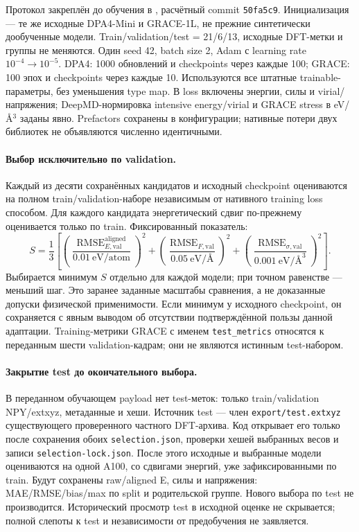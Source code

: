 \documentclass[11pt,a4paper]{article}
\begin{document}
Протокол закреплён до обучения в
,
расчётный commit \texttt{50fa5c9}. Инициализация --- те же исходные
DPA4-Mini и GRACE-1L, не прежние синтетически дообученные модели.
Train/validation/test = 21/6/13, исходные DFT-метки и группы не меняются.
Один seed 42, batch size 2, Adam с learning rate $10^{-4}\to10^{-5}$.
DPA4: 1000 обновлений и checkpoints через каждые 100;
GRACE: 100 эпох и checkpoints через каждые 10.
Используются все штатные trainable-параметры, без уменьшения type map.
В loss включены энергии, силы и virial/напряжения;
DeepMD-нормировка intensive energy/virial и GRACE stress в eV/\AA$^3$
заданы явно. Prefactors сохранены в конфигурации; нативные потери
двух библиотек не объявляются численно идентичными.

\paragraph{Выбор исключительно по validation.}
Каждый из десяти сохранённых кандидатов и исходный checkpoint
оцениваются на полном train/validation-наборе независимым от нативного
training loss способом. Для каждого кандидата энергетический сдвиг
по-прежнему оценивается только по train. Фиксированный показатель:
\[
 S=\frac{1}{3}\left[
 \left(\frac{\operatorname{RMSE}_{E,\mathrm{val}}^{\mathrm{aligned}}}
 {0.01\ \mathrm{eV/atom}}\right)^2+
 \left(\frac{\operatorname{RMSE}_{F,\mathrm{val}}}
 {0.05\ \text{eV/\AA}}\right)^2+
 \left(\frac{\operatorname{RMSE}_{\sigma,\mathrm{val}}}
 {0.001\ \mathrm{eV}/\text{\AA}^{3}}\right)^2\right].
\]
Выбирается минимум $S$ отдельно для каждой модели; при точном равенстве
--- меньший шаг. Это заранее заданные масштабы сравнения, а не
доказанные допуски физической применимости. Если минимум у исходного
checkpoint, он сохраняется с явным выводом об отсутствии подтверждённой
пользы данной адаптации. Training-метрики GRACE с именем
\texttt{test\_metrics} относятся к переданным шести validation-кадрам;
они не являются истинным test-набором.

\paragraph{Закрытие test до окончательного выбора.}
В переданном обучающем payload нет test-меток: только train/validation
NPY/extxyz, метаданные и хеши. Источник test --- член
\texttt{export/test.extxyz} существующего проверенного частного DFT-архива.
Код открывает его только после сохранения обоих
\texttt{selection.json}, проверки хешей выбранных весов и записи
\texttt{selection-lock.json}. После этого исходные и выбранные модели
оцениваются на одной A100, со сдвигами энергий, уже зафиксированными по train.
Будут сохранены raw/aligned E, силы и напряжения: MAE/RMSE/bias/max
по split и родительской группе. Нового выбора по test не производится.
Исторический просмотр test в исходной оценке не скрывается;
полной слепоты к test и независимости от предобучения не заявляется.
\end{document}
